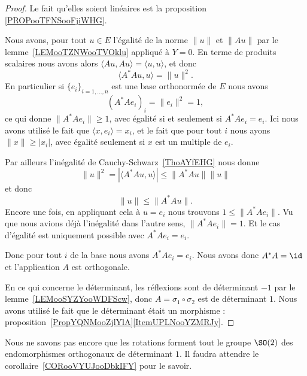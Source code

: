 \begin{proof}
    Le fait qu'elles soient linéaires est la proposition \ref{PROPooTFNSooFjiWHG}.

    Nous avons, pour tout \( u\in E\) l'égalité de la norme \( \| u \|\) et \( \| Au \|\) par le lemme~\ref{LEMooTZNWooTVOklu} appliqué à \( Y=0\). En terme de produits scalaires nous avons alors \( \langle Au, Au\rangle =\langle u, u\rangle \), et donc
    \begin{equation}
        \langle A^*Au, u\rangle =\| u \|^2.
    \end{equation}
    En particulier si \( \{ e_i \}_{i=1,\ldots, n}\) est une base orthonormée de \( E\) nous avons
    \begin{equation}
        (A^*Ae_i)_i=\| e_i \|^2=1,
    \end{equation}
    ce qui donne \( \| A^*Ae_i \|\geq 1\), avec égalité si et seulement si \( A^*Ae_i=e_i\). Ici nous avons utilisé le fait que \( \langle x, e_i\rangle =x_i\), et le fait que pour tout \( i\) nous ayons \( \| x \|\geq | x_i |\), avec égalité seulement si \( x\) est un multiple de \( e_i\).

    Par ailleurs l'inégalité de Cauchy-Schwarz~\ref{ThoAYfEHG} nous donne
    \begin{equation}
        \| u \|^2=| \langle A^*Au, u\rangle  | \leq \| A^*Au \|\| u \|
    \end{equation}
    et donc
    \begin{equation}
        \| u \|\leq \| A^*Au \|.
    \end{equation}
    Encore une fois, en appliquant cela à \( u=e_i\) nous trouvons \( 1\leq \| A^*Ae_i \|\). Vu que nous avions déjà l'inégalité dans l'autre sens, \( \| A^*Ae_i \|=1\). Et le cas d'égalité est uniquement possible avec \( A^*Ae_i=e_i\).

    Donc pour tout \( i\) de la base nous avons \( A^*Ae_i=e_i\). Nous avons donc \( A^*A=\id\) et l'application \( A\) est orthogonale.

    En ce qui concerne le déterminant, les réflexions sont de déterminant \( -1\) par le lemme~\ref{LEMooSYZYooWDFScw}, donc \( A=\sigma_1\circ\sigma_2\) est de déterminant \( 1\). Nous avons utilisé le fait que le déterminant était un morphisme : proposition~\ref{PropYQNMooZjlYlA}\ref{ItemUPLNooYZMRJy}.
\end{proof}

\begin{remark}
    Nous ne savons pas encore que les rotations forment tout le groupe \( \SO(2)\) des endomorphismes orthogonaux de déterminant \( 1\). Il faudra attendre le corollaire~\ref{CORooVYUJooDbkIFY} pour le savoir.
\end{remark}

